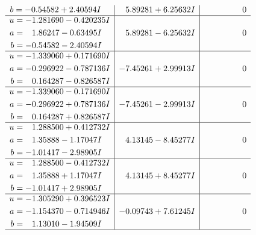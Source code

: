 \documentclass[1p]{elsarticle_modified}
\theoremstyle{definition}
\begin{document}
$$\begin{array}{c|c|c}
\begin{aligned}
b &= -0.54582 + 2.40594 I\end{aligned}
 & \phantom{-}5.89281 + 6.25632 I & \phantom{-0.000000 } 0 \\ \hline\begin{aligned}
u &= -1.281690 - 0.420235 I \\
a &= \phantom{-}1.86247 - 0.63495 I \\
b &= -0.54582 - 2.40594 I\end{aligned}
 & \phantom{-}5.89281 - 6.25632 I & \phantom{-0.000000 } 0 \\ \hline\begin{aligned}
u &= -1.339060 + 0.171690 I \\
a &= -0.296922 - 0.787136 I \\
b &= \phantom{-}0.164287 - 0.826587 I\end{aligned}
 & -7.45261 + 2.99913 I & \phantom{-0.000000 } 0 \\ \hline\begin{aligned}
u &= -1.339060 - 0.171690 I \\
a &= -0.296922 + 0.787136 I \\
b &= \phantom{-}0.164287 + 0.826587 I\end{aligned}
 & -7.45261 - 2.99913 I & \phantom{-0.000000 } 0 \\ \hline\begin{aligned}
u &= \phantom{-}1.288500 + 0.412732 I \\
a &= \phantom{-}1.35888 - 1.17047 I \\
b &= -1.01417 - 2.98905 I\end{aligned}
 & \phantom{-}4.13145 - 8.45277 I & \phantom{-0.000000 } 0 \\ \hline\begin{aligned}
u &= \phantom{-}1.288500 - 0.412732 I \\
a &= \phantom{-}1.35888 + 1.17047 I \\
b &= -1.01417 + 2.98905 I\end{aligned}
 & \phantom{-}4.13145 + 8.45277 I & \phantom{-0.000000 } 0 \\ \hline\begin{aligned}
u &= -1.305290 + 0.396523 I \\
a &= -1.154370 - 0.714946 I \\
b &= \phantom{-}1.13010 - 1.94509 I\end{aligned}
 & -0.09743 + 7.61245 I & \phantom{-0.000000 } 0\\
 \hline 
 \end{array}$$\newpage$$\begin{array}{c|c|c}  

\end{array}$$
\end{document}

